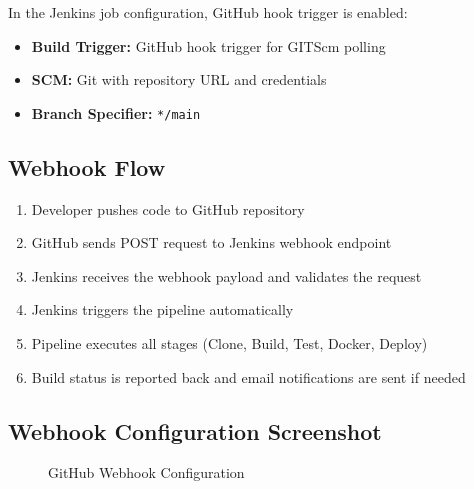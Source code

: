 \documentclass[12pt,a4paper]{article}
\begin{document}
In the Jenkins job configuration, GitHub hook trigger is enabled:

\begin{itemize}
    \item \textbf{Build Trigger:} GitHub hook trigger for GITScm polling
    \item \textbf{SCM:} Git with repository URL and credentials
    \item \textbf{Branch Specifier:} \texttt{*/main}
\end{itemize}

\subsection{Webhook Flow}

\begin{enumerate}
    \item Developer pushes code to GitHub repository
    \item GitHub sends POST request to Jenkins webhook endpoint
    \item Jenkins receives the webhook payload and validates the request
    \item Jenkins triggers the pipeline automatically
    \item Pipeline executes all stages (Clone, Build, Test, Docker, Deploy)
    \item Build status is reported back and email notifications are sent if needed
\end{enumerate}

\subsection{Webhook Configuration Screenshot}

\begin{figure}[H]
    \centering
    \caption{GitHub Webhook Configuration}
    \label{fig:webhook-config}
\end{figure}
\end{document}
